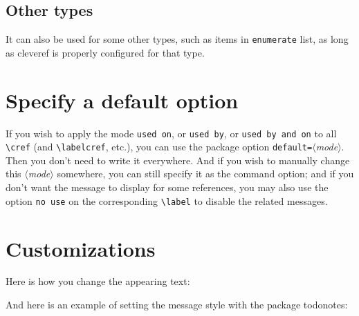 \documentclass[
    title in boldface,
    emphasize theorems,
    simple name, %
    name in link,
]{einfart}
\newcommand{\meta}[1]{$\langle${\normalfont\itshape#1}$\rangle$}
\newcommand{\packageoption}[1]{\textcolor{code-option}{\texttt{#1}}}
\newcommand{\commandoption}[1]{\textcolor{code-keys}{\texttt{#1}}}
\begin{document}
\subsection{Other types}

It can also be used for some other types, such as items in \texttt{enumerate} list, as long as \textsf{cleveref} is properly configured for that type.

\section{Specify a default option}

If you wish to apply the mode \commandoption{used on}, or \commandoption{used by}, or \commandoption{used by and on} to all \lstinline|\cref| (and \lstinline|\labelcref|, etc.), you can use the package option \packageoption{default=}\meta{mode}. Then you don't need to write it everywhere. And if you wish to manually change this \meta{mode} somewhere, you can still specify it as the command option; and if you don't want the message to display for some references, you may also use the option \commandoption{no use} on the corresponding \lstinline|\label| to disable the related messages.


\section{Customizations}

\begingroup

Here is how you change the appearing text:

\begin{code}
\end{code}


\bigskip
And here is an example of setting the message style with the package \textsf{todonotes}:

\begin{code}
\SetForwardReferenceStyle
  {%
  }
\SetForwardReferenceStyleOutsideMath
  {%
  }
\end{code}
\end{document}
